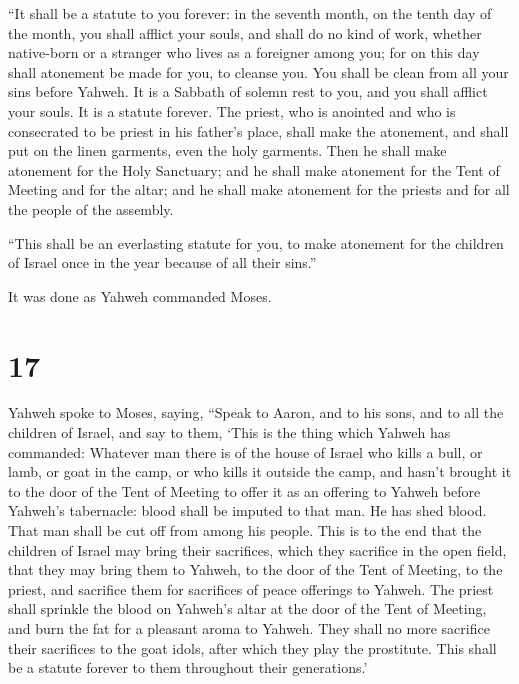  ``It shall be a statute to you forever: in the seventh
month, on the tenth day of the month, you shall afflict your souls, and
shall do no kind of work, whether native-born or a stranger who lives as
a foreigner among you;  for on this day shall atonement
be made for you, to cleanse you. You shall be clean from all your sins
before Yahweh.  It is a Sabbath of solemn rest to you,
and you shall afflict your souls. It is a statute forever.
 The priest, who is anointed and who is consecrated to be
priest in his father's place, shall make the atonement, and shall put on
the linen garments, even the holy garments.  Then he
shall make atonement for the Holy Sanctuary; and he shall make atonement
for the Tent of Meeting and for the altar; and he shall make atonement
for the priests and for all the people of the assembly.

 ``This shall be an everlasting statute for you, to make
atonement for the children of Israel once in the year because of all
their sins.''

It was done as Yahweh commanded Moses.

\hypertarget{section-16}{%
\section{17}\label{section-16}}

 Yahweh spoke to Moses, saying,  ``Speak to
Aaron, and to his sons, and to all the children of Israel, and say to
them, `This is the thing which Yahweh has commanded: 
Whatever man there is of the house of Israel who kills a bull, or lamb,
or goat in the camp, or who kills it outside the camp, 
and hasn't brought it to the door of the Tent of Meeting to offer it as
an offering to Yahweh before Yahweh's tabernacle: blood shall be imputed
to that man. He has shed blood. That man shall be cut off from among his
people.  This is to the end that the children of Israel
may bring their sacrifices, which they sacrifice in the open field, that
they may bring them to Yahweh, to the door of the Tent of Meeting, to
the priest, and sacrifice them for sacrifices of peace offerings to
Yahweh.  The priest shall sprinkle the blood on Yahweh's
altar at the door of the Tent of Meeting, and burn the fat for a
pleasant aroma to Yahweh.  They shall no more sacrifice
their sacrifices to the goat idols, after which they play the
prostitute. This shall be a statute forever to them throughout their
generations.'

